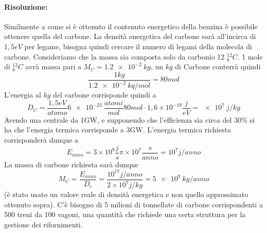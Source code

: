 \paragraph{Risoluzione:}
Similmente a come si è ottenuto il contenuto energetico della benzina è possibile ottenere quella del carbone. 
La densità energetica del carbone sarà all'incirca di $1,5 eV$ per legame, bisogna quindi cercare il numero di legami della molecola di carbone.
Consideriamo che la massa sia composta solo da carbonio 12 $^{12}_6C$.
1 mole di $^{12}_6C$ avrà massa pari a $M_C=\SI{1,2e-2}{kg}$, un $kg$ di Carbone conterrà quindi
\begin{equation}
\frac{1kg}{\SI{1,2e-2}{kq/mol}}=80 mol
\end{equation}
L'energia al $kg$ del carbone corrisponde quindi a 
\begin{equation}
D_C=\frac{1,5eV}{atomo}\SI{6e-23}{}\frac{atomi}{mol}80mol\cdot 1,6\times10^{-19}\frac{j}{eV}=\SI{e7}{j/kg}
\end{equation}
Avendo una centrale da 1GW, e supponendo che l'efficienza sia circa del $30\%$ si ha che l'energia termica corrisponde a 3GW.
L'energia termica richiesta corrisponderà dunque a 
\begin{equation}
E_{anno}=3\times10^9\frac{j}{s}  \pi\times 10^7\frac{s}{anno}=10^7j/anno
\end{equation}
La massa di carbone richiesta sarà dunque
\begin{equation}
M_C=\frac{E_{anno}}{D_c}=\frac{10^{17} j/anno}{2\times 10^7 j/kg}=\SI{5e9}{kg/anno}
\end{equation}
(è stato usato un valore reale di densità energetica e non quello approssimato ottenuto sopra).
C'è bisogno di 5 milioni di tonnellate di carbone corrispondenti a 500 treni da 100 vagoni, una quantità che richiede una certa struttura per la gestione dei rifornimenti.

